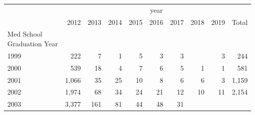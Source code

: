 \begin{table}[!h]
\centering
\begin{tabular}{llllllllll}
\cline{1-10}
\multicolumn{1}{c}{} &
  \multicolumn{9}{|c}{year} \\
\multicolumn{1}{c}{} &
  \multicolumn{1}{|r}{2012} &
  \multicolumn{1}{r}{2013} &
  \multicolumn{1}{r}{2014} &
  \multicolumn{1}{r}{2015} &
  \multicolumn{1}{r}{2016} &
  \multicolumn{1}{r}{2017} &
  \multicolumn{1}{r}{2018} &
  \multicolumn{1}{r}{2019} &
  \multicolumn{1}{r}{Total} \\
\cline{1-10}
\multicolumn{1}{l}{Med School Graduation Year} &
  \multicolumn{1}{|r}{} &
  \multicolumn{1}{r}{} &
  \multicolumn{1}{r}{} &
  \multicolumn{1}{r}{} &
  \multicolumn{1}{r}{} &
  \multicolumn{1}{r}{} &
  \multicolumn{1}{r}{} &
  \multicolumn{1}{r}{} &
  \multicolumn{1}{r}{} \\
\multicolumn{1}{l}{\hspace{1em}1999} &
  \multicolumn{1}{|r}{222} &
  \multicolumn{1}{r}{7} &
  \multicolumn{1}{r}{1} &
  \multicolumn{1}{r}{5} &
  \multicolumn{1}{r}{3} &
  \multicolumn{1}{r}{3} &
  \multicolumn{1}{r}{} &
  \multicolumn{1}{r}{3} &
  \multicolumn{1}{r}{244} \\
\multicolumn{1}{l}{\hspace{1em}2000} &
  \multicolumn{1}{|r}{539} &
  \multicolumn{1}{r}{18} &
  \multicolumn{1}{r}{4} &
  \multicolumn{1}{r}{7} &
  \multicolumn{1}{r}{6} &
  \multicolumn{1}{r}{5} &
  \multicolumn{1}{r}{1} &
  \multicolumn{1}{r}{1} &
  \multicolumn{1}{r}{581} \\
\multicolumn{1}{l}{\hspace{1em}2001} &
  \multicolumn{1}{|r}{1,066} &
  \multicolumn{1}{r}{35} &
  \multicolumn{1}{r}{25} &
  \multicolumn{1}{r}{10} &
  \multicolumn{1}{r}{8} &
  \multicolumn{1}{r}{6} &
  \multicolumn{1}{r}{6} &
  \multicolumn{1}{r}{3} &
  \multicolumn{1}{r}{1,159} \\
\multicolumn{1}{l}{\hspace{1em}2002} &
  \multicolumn{1}{|r}{1,974} &
  \multicolumn{1}{r}{68} &
  \multicolumn{1}{r}{34} &
  \multicolumn{1}{r}{24} &
  \multicolumn{1}{r}{21} &
  \multicolumn{1}{r}{12} &
  \multicolumn{1}{r}{10} &
  \multicolumn{1}{r}{11} &
  \multicolumn{1}{r}{2,154} \\
\multicolumn{1}{l}{\hspace{1em}2003} &
  \multicolumn{1}{|r}{3,377} &
  \multicolumn{1}{r}{161} &
  \multicolumn{1}{r}{81} &
  \multicolumn{1}{r}{44} &
  \multicolumn{1}{r}{48} &
  \multicolumn{1}{r}{31} &

\end{tabular}
\end{table}
